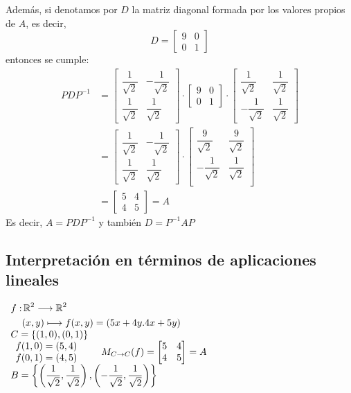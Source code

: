 Además, si denotamos por $D$ la matriz diagonal formada por los valores propios de $A$, es decir, \[ D=\begin{bmatrix}
	9 & 0\\
	0 & 1
\end{bmatrix} \]entonces se cumple:\begin{align*}
	PDP^{-1}&=\begin{bmatrix}
		\dfrac{1}{\sqrt{2}} & -\dfrac{1}{\sqrt{2}}\\
		\dfrac{1}{\sqrt{2}} & \dfrac{1}{\sqrt{2}}
	\end{bmatrix}\cdot\begin{bmatrix}
		9 & 0\\
		0 & 1
	\end{bmatrix}\cdot\begin{bmatrix}
		\dfrac{1}{\sqrt{2}} & \dfrac{1}{\sqrt{2}}\\
		-\dfrac{1}{\sqrt{2}} & \dfrac{1}{\sqrt{2}}
	\end{bmatrix}\\
	&=\begin{bmatrix}
		\dfrac{1}{\sqrt{2}} & -\dfrac{1}{\sqrt{2}}\\
		\dfrac{1}{\sqrt{2}} & \dfrac{1}{\sqrt{2}}
	\end{bmatrix}\cdot\begin{bmatrix}
		\dfrac{9}{\sqrt{2}} & \dfrac{9}{\sqrt{2}}\\
		-\dfrac{1}{\sqrt{2}} & \dfrac{1}{\sqrt{2}}\\
	\end{bmatrix}\\
	&=\begin{bmatrix}
		5 & 4\\
		4 & 5
	\end{bmatrix}=A
\end{align*}
Es decir, $A=PDP^{-1}$ y también $D=P^{-1}AP$
\subsection{Interpretación en términos de aplicaciones lineales}

$\begin{array}{l}
	\begin{aligned}
		f:&\operatorname{\mathbb{R}}^2\longrightarrow\operatorname{\mathbb{R}}^2\\
		&(x,y)\longmapsto f(x,y)=(5x+4y.4x+5y)
	\end{aligned}\\
	C=\{(1,0),(0,1)\}\\
	\begin{array}{l}
		f(1,0)=(5,4)\\
		f(0,1)=(4,5)
	\end{array}\qquad M_{C\to C}(f)=\begin{bmatrix}
		5 &4\\
		4 & 5
	\end{bmatrix}=A\\
	B=\left\{\left(\dfrac{1}{\sqrt{2}},\dfrac{1}{\sqrt{2}}\right),\left(-\dfrac{1}{\sqrt{2}},\dfrac{1}{\sqrt{2}}\right)\right\}\\
\end{array}$

